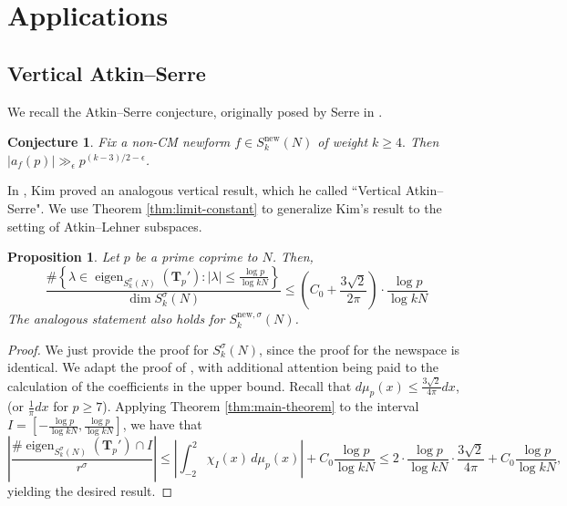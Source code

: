 \documentclass[11pt,letterpaper,reqno]{amsart}
\newtheorem{proposition}[theorem]{Proposition}
\newtheorem{conjecture}[theorem]{Conjecture}
\theoremstyle{definition}
\numberwithin{equation}{section}
\numberwithin{figure}{section}
\numberwithin{table}{section}
\let\subsectiontemp\subsection
\renewcommand{\subsection}[1]{ 
    \subsectiontemp{#1} \hfill\vspace{0.5\linespacing} 
}
\newcommand{\nw}{\mathrm{new}}
\begin{document}
\section{Applications}
\label{section:applications}


\subsection{Vertical Atkin--Serre}\label{subsection:vertical-Atkin--Serre}

We recall the Atkin--Serre conjecture, originally posed by Serre in \cite{Ser81}.

{
\renewcommand{\thetheorem}{(Atkin--Serre)}
\begin{conjecture}
    Fix a non-CM newform $f \in S_k^\nw(N)$ of weight $k \geq 4.$ Then
    $\left| a_f(p) \right| \gg_\epsilon p^{(k - 3)/2 - \epsilon}$.
\end{conjecture}
\addtocounter{theorem}{-1}
}

In \cite[Theorem 2.2]{Kim24}, Kim proved an analogous vertical result, which he called ``Vertical Atkin--Serre". We use Theorem \ref{thm:limit-constant} to generalize Kim's result to the setting of Atkin--Lehner subspaces.
{
\renewcommand{\thetheorem}{\ref{prop:vertical-Atkin--Serre}}
\begin{proposition}
    Let $p$ be a prime coprime to $N$. Then,
    $$\frac{\#\left\{ \lambda \in \operatorname{eigen}_{S_k^\sigma(N)} \! \left( \mathbf{T}_{p}'  \right) : \left| \lambda \right| \leq \frac{\log p}{\log kN} \right\}}{\dim S_k^\sigma(N)} \leq \left(C_0 + \frac{3\sqrt{2}}{2\pi} \right) \cdot  \frac{\log p}{\log  kN}$$
    The analogous statement also holds for $S_k^{\nw,\sigma}(N)$.
\end{proposition}
\addtocounter{theorem}{-1}
}
\begin{proof}
    We just provide the proof for $S_k^{\sigma}(N)$, since the proof for the newspace is identical. We adapt the proof of \cite[Theorem 2.2]{Kim24}, with additional attention being paid to the calculation of the coefficients in the upper bound. Recall that $d\mu_p(x) \leq \frac{3\sqrt{2}}{4\pi} dx$, (or $\frac{1}{\pi} dx$ for $p \geq 7$). Applying Theorem \ref{thm:main-theorem} to the interval $I = \left[ - \frac{\log p}{\log kN} , \frac{\log p}{\log kN}  \right]$, we have that
    $$\left| \frac{ \# \operatorname{eigen}_{S_k^\sigma(N)}(\mathbf{T}_p') \cap I}{r^\sigma} \right| \leq \left| \int_{-2}^2 \chi_I(x) \,  d \mu_p(x)  \right| + C_0   \frac{\log p}{\log  kN}  \leq  2 \cdot \frac{\log p}{\log kN} \cdot \frac{3\sqrt{2}}{4\pi} + C_0  \frac{\log p}{\log  kN},$$
    yielding the desired result.
\end{proof}
\end{document}
